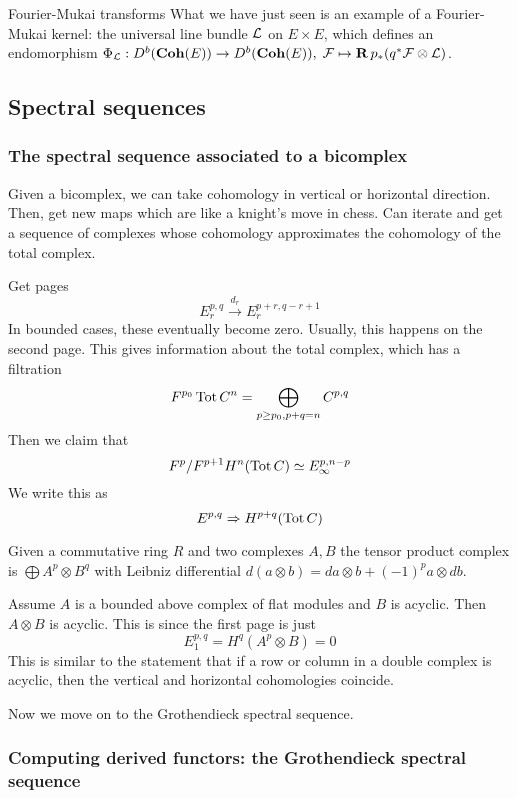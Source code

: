 \begin{remark}{Fourier-Mukai transforms}{}
    What we have just seen is an example of a Fourier-Mukai kernel: the universal line bundle $\mathcal{L}$ on $E\times E$, which defines an endomorphism $\Phi_{\mathcal{L}}:D^b(\operatorname{\mathbf{Coh}}(E))\to D^b(\operatorname{\mathbf{Coh}}(E)),\;\mathcal{F}\mapsto\operatorname{\mathbf{R}} p_*(q^*\mathcal{F}\otimes\mathcal{L})$.

\end{remark}

\subsection{Spectral sequences}
\subsubsection{The spectral sequence associated to a bicomplex}

Given a bicomplex, we can take cohomology in vertical or horizontal direction. Then, get new maps which are like a knight's move in chess. Can iterate and get a sequence of complexes whose cohomology approximates the cohomology of the total complex.

Get pages $$E_{r}^{p,q}\xrightarrow{d_{r}} E_{r}^{p+r,q-r+1}$$
In bounded cases, these eventually become zero. Usually, this happens on the second page. This gives information about the total complex, which has a filtration $$F^{p_{0}} \operatorname{Tot} C^n=\bigoplus_{p\geq p_{0}, p+q=n} C^{p,q}$$Then we claim that $$F^p/F^{p+1} H^n(\operatorname{Tot} C)\simeq E_{\infty}^{p,n-p}$$We write this as $$E^{p,q}\Rightarrow H^{p+q}(\operatorname{Tot} C)$$

Given a commutative ring $R$ and two complexes $A,B$ the tensor product complex is $\bigoplus A^p\otimes B^q$ with Leibniz differential $d(a\otimes b)=da\otimes b + (-1)^p a\otimes db$.

Assume $A$ is a bounded above complex of flat modules and $B$ is acyclic. Then $A\otimes B$ is acyclic. This is since the first page is just $$E_{1}^{p,q}=H^q(A^p\otimes B)=0$$
This is similar to the statement that if a row or column in a double complex is acyclic, then the vertical and horizontal cohomologies coincide.

Now we move on to the Grothendieck spectral sequence.

\subsubsection{Computing derived functors: the Grothendieck spectral sequence}


